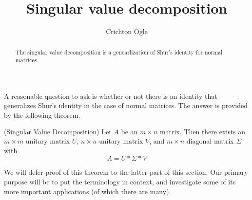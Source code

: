 \documentclass{ximera}
\title{Singular value decomposition}
\author{Crichton Ogle}
\begin{document}
\begin{abstract}
  The singular value decomposition is a genearlization of Shur's
  identity for normal matrices.
\end{abstract}
\maketitle

A reasonable question to ask is whether or not there is an identity that generalizes Shur's identity in the case of normal matrices. The answer is provided by the following theorem.

\begin{theorem} (Singular Value Decomposition) Let $A$ be an $m\times n$ matrix. Then there exists an $m\times m$ unitary matrix $U$, $n\times n$ unitary matrix $V$, and $m\times n$ diagonal matrix $\Sigma$ with
\[
A = U*\Sigma*V
\]
\end{theorem}

We will defer proof of this theorem to the latter part of this section. Our primary purpose will be to put the terminology in context, and investigate some of its more important applications (of which there are many).
\end{document}
